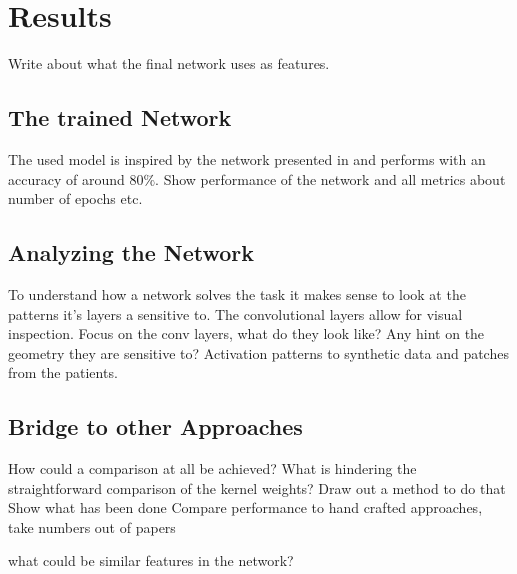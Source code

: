 \documentclass[main.tex]{subfiles}
\begin{document}
\chapter{Results}\label{chap:04results}
Write about what the final network uses as features.
\section{The trained Network}
The used model is inspired by the network presented in \cite{huang2017lung} and performs with an accuracy of around 80$\%$.
Show performance of the network and all metrics about number of epochs etc.


\section{Analyzing the Network}
To understand how a network solves the task it makes sense to look at the patterns it's layers a sensitive to. The convolutional layers allow for visual inspection.
Focus on the conv layers, what do they look like? Any hint on the geometry they are sensitive to?
Activation patterns to synthetic data and patches from the patients.

\section{Bridge to other Approaches}
How could a comparison at all be achieved? What is hindering the straightforward comparison of the kernel weights? Draw out a method to do that
Show what has been done
Compare performance to hand crafted approaches, 
take numbers out of papers

what could be similar features in the network?
\end{document}
